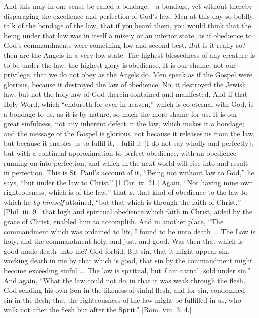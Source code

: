 And this may in one sense be called a bondage,—a bondage, yet
without thereby disparaging the excellence and perfection of God's
law. Men at this day so boldly talk of the bondage of the law, that if
you heard them, you would think that the being under that law was in
itself a misery or an inferior state, as if obedience to God's
commandments were something low and second best. But is it really so?
then are the Angels in a very low state. The highest blessedness of
any creature is to be under the law, the highest glory is obedience.
It is our shame, not our privilege, that we do not obey as the Angels
do. Men speak as if the Gospel were glorious, because it destroyed the
law of obedience. No; it destroyed the Jewish law, but not the holy
law of God therein contained and manifested. And if that Holy Word,
which ``endureth for ever in heaven,'' which is co-eternal
with God, is a bondage to us, as it is by nature, so much the more
shame for us. It is our great sinfulness, not any inherent defect in
the law, which makes it a bondage; and the message of the Gospel is
glorious, not because it releases us from the law, but because it
enables us to fulfil it,—fulfil it (I do not say wholly and
perfectly), but with a continual approximation to perfect obedience,
with an obedience running on into perfection, and which in the next
world will rise into and result in perfection. This is St. Paul's
account of it, ``Being not without law to God,'' he says,
``but under the law to Christ.'' [1 Cor. ix. 21.] Again,
``Not having mine own righteousness, which is of the law,''
that is, that kind of obedience to the law to which he \emph{by himself}
attained, ``but that which is through the faith of Christ,''
[Phil. iii. 9.] that high and spiritual obedience which faith in
Christ, aided by the grace of Christ, enabled him to accomplish. And
in another place, ``The commandment which was ordained to life, I
found to be unto death ... The Law is holy, and the commandment holy,
and just, and good. Was then that which is good made death unto me?
God forbid. But sin, that it might appear sin, working death in me by
that which is good, that sin by the commandment might become exceeding
sinful ... The law is spiritual, but \emph{I} am carnal, sold under
sin.'' And again, ``What the law could not do, in that it was
weak through the flesh, God sending his own Son in the likeness of
sinful flesh, and for sin, condemned sin in the flesh; that the
righteousness of the law might be fulfilled in us, who walk not after
the flesh but after the Spirit.'' [Rom. viii. 3, 4.]

